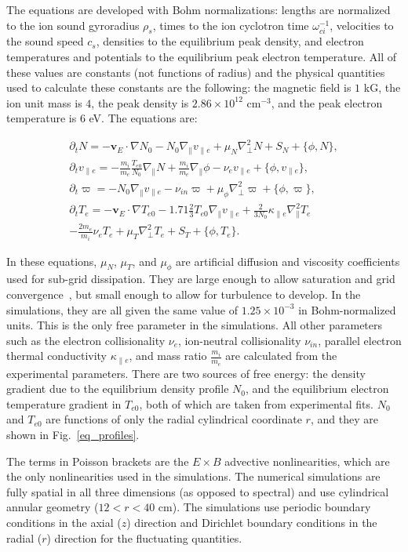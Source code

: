 \documentclass[showpacs,preprintnumbers,amsmath,amssymb,superscriptaddress]{revtex4}
\def\beqar{\begin{eqnarray}}
\def\eeqar{\end{eqnarray}}
\newcommand{\pdt}{\partial_t}
\def\grad{\nabla}
\newcommand{\gradpar}{\grad_\parallel}
\newcommand{\gradperp}{\grad_\perp}
\newcommand{\vpe}{v_{\parallel e}}
\newcommand{\nue}{\nu_{e}}
\newcommand{\nuin}{\nu_{in}}
\newcommand{\kpe}{\kappa_{\parallel e}}
\newcommand{\fmie}{\frac{m_i}{m_e}}
\begin{document}
The equations are developed with Bohm normalizations: lengths are
normalized to the ion sound gyroradius $\rho_s$, times to the ion
cyclotron time $\omega_{ci}^{-1}$, velocities to the sound speed $c_s$, densities to the equilibrium peak density, and electron
temperatures and potentials to the equilibrium peak electron temperature. All of these values are constants (not functions of radius) and the physical quantities used to calculate 
these constants are the following: the magnetic field is $1$ kG, the ion unit mass is $4$, the peak density is $2.86 \times 10^{12}$ cm$^{-3}$, and the peak electron temperature
is $6$ eV. The equations are:

\beqar
\label{ni_eq}
\pdt N = - {\mathbf v_E} \cdot \grad N_0 - N_0 \gradpar \vpe + \mu_N \gradperp^2 N + S_N + \{\phi,N\}, \\
\label{ve_eq}
\pdt \vpe = - \fmie \frac{T_{e0}}{N_0} \gradpar N + \fmie \gradpar \phi - \nue \vpe + \{\phi,\vpe \}, \\
\label{rho_eq}
\pdt \varpi = - N_0 \gradpar \vpe  - \nuin \varpi + \mu_\phi \gradperp^2 \varpi + \{\phi,\varpi \}, \\
\label{te_eq}
\pdt T_e = - {\mathbf v_E} \cdot \grad T_{e0} - 1.71 \frac{2}{3} T_{e0} \gradpar \vpe + \frac{2}{3 N_0} \kpe \gradpar^2 T_e  \nonumber \\
- \frac{2 m_e}{m_i} \nue T_e  + \mu_T \gradperp^2 T_e +  S_T + \{\phi,T_e\}.
\eeqar

In these equations, $\mu_N$, $\mu_T$, and $\mu_\phi$ are artificial diffusion and viscosity coefficients used for sub-grid dissipation. They are large enough to allow saturation
and grid convergence~\cite{friedman2012}, but small enough to allow for turbulence to develop. In the simulations, they are all given the same value of $1.25 \times 10^{-3}$ in Bohm-normalized units. 
This is the only free parameter in the simulations. All other parameters such as the electron collisionality $\nue$, ion-neutral
collisionality $\nuin$, parallel electron thermal conductivity $\kpe$, and mass ratio $\fmie$ are calculated from the experimental parameters.
There are two sources of free energy: the density gradient due to the equilibrium density profile $N_0$, and the equilibrium electron temperature gradient in $T_{e0}$, both of which are
taken from experimental fits. $N_0$ and $T_{e0}$ are functions of only the radial cylindrical coordinate $r$, and they are shown in Fig.~\ref{eq_profiles}. 

The terms in Poisson brackets are the $E \times B$ advective nonlinearities, which are the only nonlinearities used in the simulations.
The numerical simulations are fully spatial in all three dimensions (as opposed to spectral) and use cylindrical annular geometry ($12<r<40$ cm).
The simulations use periodic boundary conditions in the axial ($z$) direction and Dirichlet boundary
conditions in the radial ($r$) direction for the fluctuating quantities. 
\end{document}
